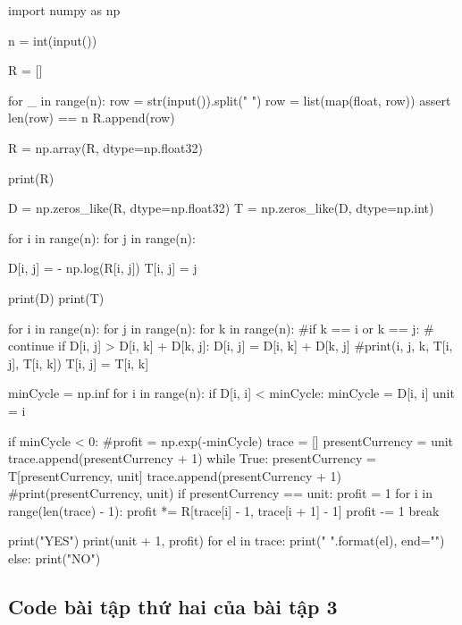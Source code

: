 \documentclass[14pt, a4paper]{article}
\theoremstyle{sltheorem}
\theoremstyle{soltheorem}
\begin{document}
\begin{python}
import numpy as np
    
    
n = int(input())
                
R = []
                
for _ in range(n):
    row = str(input()).split(" ")
    row = list(map(float, row))
    assert len(row) == n
    R.append(row)
                
R = np.array(R, dtype=np.float32)
                
print(R)
                
D = np.zeros_like(R, dtype=np.float32)
T = np.zeros_like(D, dtype=np.int)
                
for i in range(n):
    for j in range(n):
            
        D[i, j] = - np.log(R[i, j])
        T[i, j] = j
                        
                
print(D)
print(T)
                
                
                
for i in range(n):
    for j in range(n):
        for k in range(n):        
            #if k == i or k == j:
            #    continue
            if D[i, j] > D[i, k] + D[k, j]:
                D[i, j] = D[i, k] + D[k, j]
                #print(i, j, k, T[i, j], T[i, k])
                T[i, j] = T[i, k]
            
minCycle = np.inf
for i in range(n):
    if D[i, i] < minCycle:
        minCycle = D[i, i]
        unit = i
                
if minCycle < 0:
    #profit = np.exp(-minCycle)
    trace = []
    presentCurrency = unit
    trace.append(presentCurrency + 1)
    while True:
        presentCurrency = T[presentCurrency, unit]
        trace.append(presentCurrency + 1)
        #print(presentCurrency, unit)
        if presentCurrency == unit:
            profit = 1
            for i in range(len(trace) - 1):
                profit *= R[trace[i] - 1, trace[i + 1] - 1]
            profit -= 1
            break
            
            print("YES")
            print(unit + 1, profit)
            for el in trace:
                print("{} ".format(el), end="")
        else:
            print("NO")
\end{python}

\subsection{Code bài tập thứ hai của bài tập 3} \label{code-2-ex-3}
\end{document}
